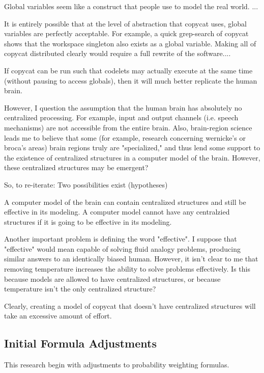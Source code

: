 \documentclass[a4paper]{article}
\begin{document}
    Global variables seem like a construct that people use to model the real world.
    ...

    It is entirely possible that at the level of abstraction that copycat uses, global variables are perfectly acceptable.
    For example, a quick grep-search of copycat shows that the workspace singleton also exists as a global variable.
    Making all of copycat distributed clearly would require a full rewrite of the software....

    If copycat can be run such that codelets may actually execute at the same time (without pausing to access globals), then it will much better replicate the human brain.

    However, I question the assumption that the human brain has absolutely no centralized processing.
    For example, input and output channels (i.e. speech mechanisms) are not accessible from the entire brain.
    Also, brain-region science leads me to believe that some (for example, research concerning wernicke's or broca's areas) brain regions truly are "specialized," and thus lend some support to the existence of centralized structures in a computer model of the brain.
    However, these centralized structures may be emergent?

    So, to re-iterate: Two possibilities exist (hypotheses)

    A computer model of the brain can contain centralized structures and still be effective in its modeling.
    A computer model cannot have any centralzied structures if it is going to be effective in its modeling.

    Another important problem is defining the word "effective".
    I suppose that "effective" would mean capable of solving fluid analogy problems, producing similar answers to an identically biased human.
    However, it isn't clear to me that removing temperature increases the ability to solve problems effectively.
    Is this because models are allowed to have centralized structures, or because temperature isn't the only centralized structure?

    Clearly, creating a model of copycat that doesn't have centralized structures will take an excessive amount of effort.

\subsection{Initial Formula Adjustments}

This research begin with adjustments to probability weighting formulas.
\end{document}
